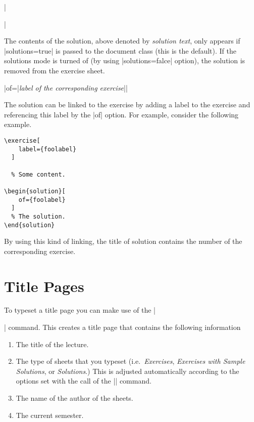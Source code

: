 \documentclass[a4paper,fleqn]{report}
\def\syntaxdefaultarg#1{\hfill\texttt{\small #1}\par\smallskip\noindent\ignorespaces}
\def\metaargument#1{\textit{\small #1}}
\begin{document}
\begin{syntax}
  ||
  \syntaxdefaultarg{}
  The contents of the solution, above denoted by
  \metaargument{solution text}, only appears if |solutions=true| is
  passed to the document class (this is the default). If the solutions
  mode is turned of (by using |solutions=falce| option), the solution
  is removed from the exercise sheet.

  \begin{syntax}
    |of={|\metaargument{label of the corresponding exercise}|}| 
    \syntaxdefaultarg{}
    The solution can be linked to the exercise by adding a label to
    the exercise and referencing this label by the |of| option. For
    example, consider the following example.
    \begin{lstlisting}
\exercise[
    label={foolabel}
  ]

  % Some content.

\begin{solution}[
    of={foolabel}
  ]
  % The solution.
\end{solution}

    \end{lstlisting}
    \noindent By using this kind of linking, the title of solution
    contains the number of the corresponding exercise.
  \end{syntax}
\end{syntax}


\section{Title Pages}

To typeset a title page you can make use of the |\maketitle| command.
This creates a title page that contains the following information
\begin{enumerate}
  \item The title of the lecture.
  \item The type of sheets that you typeset (i.e.\ 
    \emph{Exercises},
    \emph{Exercises with Sample Solutions}, or 
    \emph{Solutions}.) This is adjusted automatically according to the
      options set with the call of the |\sheetconf| command.
  \item The name of the author of the sheets.
  \item The current semester.
\end{enumerate}
\end{document}
